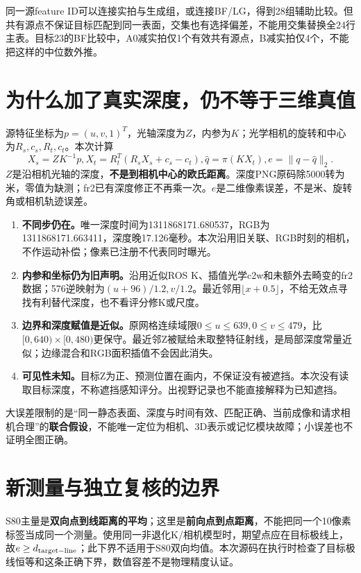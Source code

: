 \documentclass[UTF8,11pt,a4paper]{ctexart}
\begin{document}
同一源feature ID可以连接实拍与生成组，或连接BF/LG，得到28组辅助比较。但共有源点不保证目标匹配到同一表面，交集也有选择偏差，不能用交集替换全24行主表。目标23的BF比较中，A0减实拍仅1个有效共有源点，B减实拍仅4个，不能把这样的中位数外推。
\clearpage
\section{ 为什么加了真实深度，仍不等于三维真值}
源特征坐标为$p=(u,v,1)^T$，光轴深度为$Z$，内参为$K$；光学相机的旋转和中心为$R_s,c_s,R_t,c_t$。本次计算
\[
X_s=ZK^{-1}p,  X_t=R_t^T(R_sX_s+c_s-c_t), 
\hat q=\pi(KX_t),  e=\|q-\hat q\|_2.
\]
$Z$是沿相机光轴的深度，\textbf{不是到相机中心的欧氏距离}。深度PNG原码除5000转为米，零值为缺测；fr2已有深度修正不再乘一次。$e$是二维像素误差，不是米、旋转角或相机轨迹误差。

\begin{enumerate}
\item \textbf{不同步仍在。}唯一深度时间为1311868171.680537，RGB为1311868171.663411，深度晚17.126毫秒。本次沿用旧关联、RGB时刻的相机，不作运动补偿；像素已注册不代表同时曝光。
\item \textbf{内参和坐标仍为旧声明。}沿用近似ROS K、插值光学c2w和未额外去畸变的fr2数据；576逆映射为$(u+96)/1.2,v/1.2$。最近邻用$\lfloor x+0.5\rfloor$，不给无效点寻找有利替代深度，也不看评分修K或尺度。
\item \textbf{边界和深度赋值是近似。}原网格连续域限$0\le u\le639,0\le v\le479$，比$[0,640)\times[0,480)$更保守。最近邻Z被赋给未取整特征射线，是局部深度常量近似；边缘混合和RGB面积插值不会因此消失。
\item \textbf{可见性未知。}目标Z为正、预测位置在画内，不保证没有被遮挡。本次没有读取目标深度，不称遮挡感知评分。出视野记录也不能直接解释为已知遮挡。
\end{enumerate}

大误差限制的是“同一静态表面、深度与时间有效、匹配正确、当前成像和请求相机合理”的\textbf{联合假设}，不能唯一定位为相机、3D表示或记忆模块故障；小误差也不证明全图正确。

\section{ 新测量与独立复核的边界}
S80主量是\textbf{双向点到线距离的平均}；这里是\textbf{前向点到点距离}，不能把同一个10像素标签当成同一个测量。使用同一非退化K/相机模型时，期望点应在目标极线上，故$e\ge d_{\rm target-line}$；此下界不适用于S80双向均值。本次源码在执行时检查了目标极线恒等和这条正确下界，数值容差不是物理精度认证。
\end{document}
